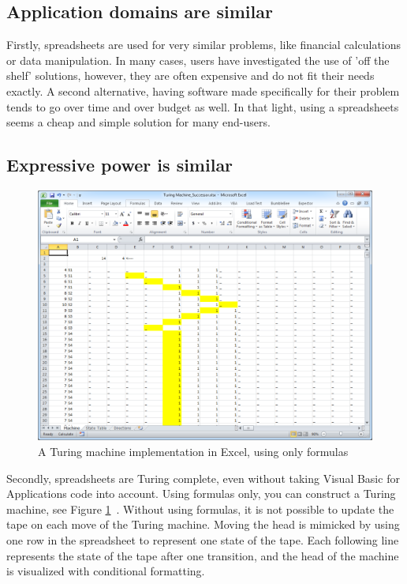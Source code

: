 \documentclass[conference]{IEEEtran}
\begin{document}
\subsection{Application domains are similar}
Firstly, spreadsheets are used for very similar problems, like financial calculations or data manipulation. In many cases, users have investigated the use of 'off the shelf' solutions, however, they are often expensive and do not fit their needs exactly. A second alternative, having software made specifically for their problem tends to go over time and over budget as well. In that light, using a spreadsheets seems a cheap and simple solution for many end-users.

\subsection{Expressive power is similar}

\begin{figure}
  \begin{center}
  \includegraphics[width=\columnwidth]{fig/turing.png}
  \caption{A Turing machine implementation in Excel, using only formulas}
  \label{fig:visical}
  \end{center}
\end{figure} 

Secondly, spreadsheets are Turing complete, even without taking Visual Basic for Applications code into account. Using formulas only, you can construct a Turing machine, see Figure \ref{fig:visical}~\cite{Turing2013}. Without using formulas, it is not possible to update the tape on each move of the Turing machine. Moving the head is mimicked by using one row in the spreadsheet to represent one state of the tape. Each following line represents the state of the tape after one transition, and the head of the machine is visualized with conditional formatting.
\end{document}
